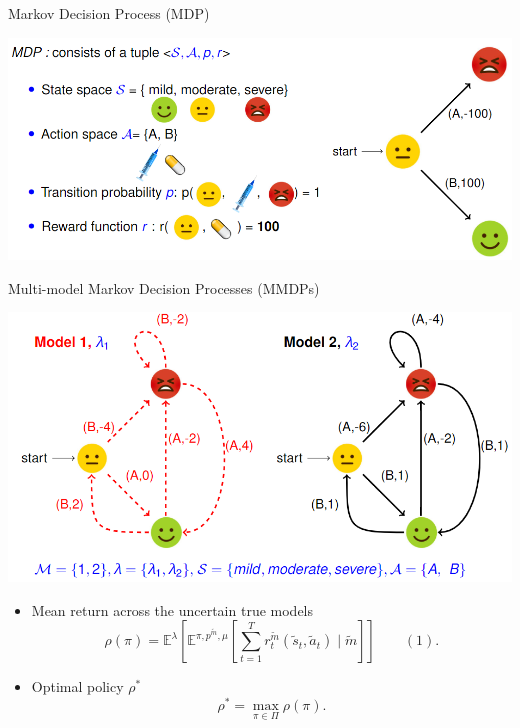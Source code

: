 
\begin{block}{Markov Decision Process (MDP)}
\vspace{0.15cm}
    \begin{center}
    \includegraphics[width=0.95\linewidth]{fig/mdp.png}    
  \end{center}
  \vspace{0.15cm}
\end{block}

\begin{block}{\normalsize{Multi-model Markov Decision Processes (MMDPs)}}
    \begin{center}
    \includegraphics[width=0.83\linewidth]{fig/mmdps.png}
  \end{center}
 
  \begin{itemize}
     \item Mean return across the uncertain true models
     \[
       \rho(\pi)= \mathbb{E}^{\lambda} \left[  \mathbb{E}^{\pi,p^{\tilde{m}},\mu} \left[ \sum_{t=1}^{T}  r_{t}^{\tilde{m}}(\tilde{s}_{t},\tilde{a}_{t}) \mid \tilde{m} \right] \right]  \quad\quad(1).  
     \]
     \item Optimal policy $\rho^* $
     \[
      \rho^* = \max_{\pi \in \Pi}\rho(\pi).
     \]
    
\end{itemize}
\end{block}






